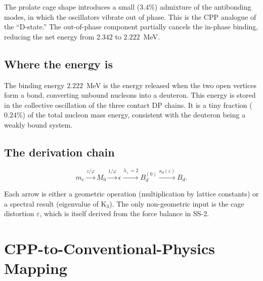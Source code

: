 \documentclass[11pt,letterpaper]{article}
\newcommand{\phig}{\varphi}
\newcommand{\Kthree}{\mathrm{K}_3}
\newcommand{\Mzero}{M_0}
\newcommand{\Bd}{B_d}
\newcommand{\Bdlo}{B_d^{(0)}}
\newcommand{\epscage}{\varepsilon}
\newcommand{\kd}{\kappa_d}
\begin{document}
The prolate cage shape introduces a small ($3.4\%$)
admixture of the antibonding modes, in which the oscillators
vibrate out of phase.  This is the CPP analogue of the
``D-state.''  The out-of-phase component partially
cancels the in-phase binding, reducing the net energy
from $2.342$ to $2.222$~MeV.

\subsection{Where the energy is}

The binding energy $2.222$~MeV is the energy released when
the two open vertices form a bond, converting unbound
nucleons into a deuteron.  This energy is stored in the
collective oscillation of the three contact DP chains.
It is a tiny fraction ($0.24\%$) of the total nucleon
mass energy, consistent with the deuteron being a weakly
bound system.

\subsection{The derivation chain}

\begin{equation}
m_e \xrightarrow{z/\phig} \Mzero
\xrightarrow{1/\phig} \epsilon
\xrightarrow{\lambda_+ = 2} \Bdlo
\xrightarrow{\kd(\epscage)} \Bd.
\end{equation}

Each arrow is either a geometric operation (multiplication
by lattice constants) or a spectral result (eigenvalue of
$\Kthree$).  The only non-geometric input is the cage
distortion $\epscage$, which is itself derived from the
force balance in SS-2.

\section{CPP-to-Conventional-Physics Mapping}
\label{sec:mapping}
\end{document}
